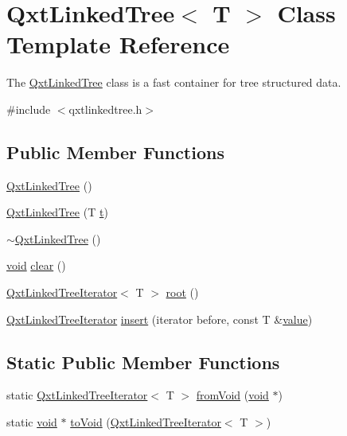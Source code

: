 \hypertarget{class_qxt_linked_tree}{\section{Qxt\-Linked\-Tree$<$ T $>$ Class Template Reference}
\label{class_qxt_linked_tree}
}


The \hyperlink{class_qxt_linked_tree}{Qxt\-Linked\-Tree} class is a fast container for tree structured data.  




{\ttfamily \#include $<$qxtlinkedtree.\-h$>$}

\subsection*{Public Member Functions}
\begin{DoxyCompactItemize}
\item 
\hyperlink{class_qxt_linked_tree_ad158f409027096b14e072f8904db4ba6}{Qxt\-Linked\-Tree} ()
\item 
\hyperlink{class_qxt_linked_tree_a9fbff531f2a9a859ac3f6075efbf977f}{Qxt\-Linked\-Tree} (T \hyperlink{glext_8h_a00140d6f5c548b26daf170bf16e86a6d}{t})
\item 
\hyperlink{class_qxt_linked_tree_abeb7af48424a243f2d27783220311767}{$\sim$\-Qxt\-Linked\-Tree} ()
\item 
\hyperlink{group___u_a_v_objects_plugin_ga444cf2ff3f0ecbe028adce838d373f5c}{void} \hyperlink{class_qxt_linked_tree_a80bafd467908ef1ed3f41d15d299d9a2}{clear} ()
\item 
\hyperlink{class_qxt_linked_tree_iterator}{Qxt\-Linked\-Tree\-Iterator}$<$ T $>$ \hyperlink{class_qxt_linked_tree_a9cbfc5713ced469ec42864255675d020}{root} ()
\item 
\hyperlink{class_qxt_linked_tree_iterator}{Qxt\-Linked\-Tree\-Iterator} \hyperlink{class_qxt_linked_tree_aa5d51a97689ba9a15d5cad16e9c57f43}{insert} (iterator before, const T \&\hyperlink{glext_8h_aa0e2e9cea7f208d28acda0480144beb0}{value})
\end{DoxyCompactItemize}
\subsection*{Static Public Member Functions}
\begin{DoxyCompactItemize}
\item 
static \hyperlink{class_qxt_linked_tree_iterator}{Qxt\-Linked\-Tree\-Iterator}$<$ T $>$ \hyperlink{class_qxt_linked_tree_a3b66fda568121c7aaa08481f25aad206}{from\-Void} (\hyperlink{group___u_a_v_objects_plugin_ga444cf2ff3f0ecbe028adce838d373f5c}{void} $\ast$)
\item 
static \hyperlink{group___u_a_v_objects_plugin_ga444cf2ff3f0ecbe028adce838d373f5c}{void} $\ast$ \hyperlink{class_qxt_linked_tree_a52912acd545c24d7971a57cef4a2285b}{to\-Void} (\hyperlink{class_qxt_linked_tree_iterator}{Qxt\-Linked\-Tree\-Iterator}$<$ T $>$)
\end{DoxyCompactItemize}


